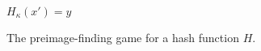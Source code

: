 \begin{figure}[t]
\begin{algorithm}[H]
    \caption{\label{alg.preimage-game} The preimage-finding
             game for a hash function $H$.}
    \begin{algorithmic}[1]
            \State\Return $H_\kappa(x') = y$
        \EndFunction
        \vskip8pt
    \end{algorithmic}
\end{algorithm}
\end{figure}
